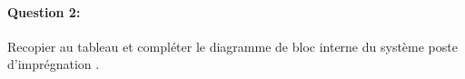 \begin{center}
\end{center}

\paragraph{Question 2:} Recopier au tableau et compléter le diagramme de bloc interne du système \og poste d'imprégnation \fg.

